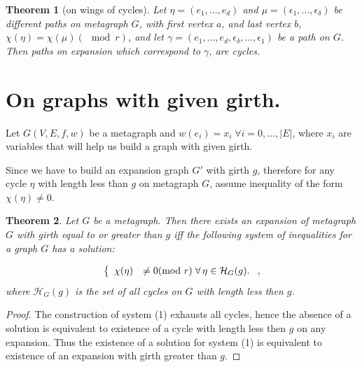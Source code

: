 \documentclass[14pt]{mmcs-article}
\newtheorem{theorem}{Theorem}
\begin{document}
\begin{theorem}[on wings of cycles]\label{theorem_wings}
    Let $\eta = (e_1, ..., e_d)$ and $\mu = (\epsilon_1, ..., \epsilon_{\delta})$ be different paths on metagraph $G$, with first vertex $a$, and last vertex $b$, $\chi(\eta) = \chi(\mu) (\mod{r})$, and let $\gamma = (e_1, \dots, e_d, \epsilon_{\delta}, \dots, \epsilon_1)$ be a path on $G$. Then paths on expansion which correspond to $\gamma$, are cycles.
\end{theorem}

\section{On graphs with given girth.}


Let $G(V, E, f, w)$ be a metagraph and $w(e_i) = x_i \; \forall i = 0, \dots, |E|$, where $x_i$ are variables that will help us build a graph with given girth.


Since we have to build an expansion graph $G'$ with girth $g$, therefore for any cycle $\eta$ with length less than $g$ on metagraph $G$, assume inequality of the form $\chi(\eta) \neq 0$.

\begin{theorem}

Let $G$ be a metagraph. Then there exists an expansion of metagraph $G$ with girth equal to or greater than $g$ iff the following system of inequalities for a graph $G$ has a solution:

\begin{equation}
    \centering
    \left\{
        \begin{array}{ll}
            \chi(\eta) &\neq 0 (\mod{r}) \; \forall \, \eta \in \mathcal{H}_G(g).
        \end{array}
    \right.,
    \label{eqs:example}
\end{equation}
where $\mathcal{H}_G(g)$ is the set of all cycles on $G$ with length less then $g$.

\end{theorem}

\begin{proof}
    The construction of system (1) exhausts all cycles, hence the absence of a solution is equivalent to existence of a cycle with length less then $g$ on any expansion. Thus the existence of a solution for system (1) is equivalent to existence of an expansion with girth greater than $g$.
\end{proof}
\end{document}
